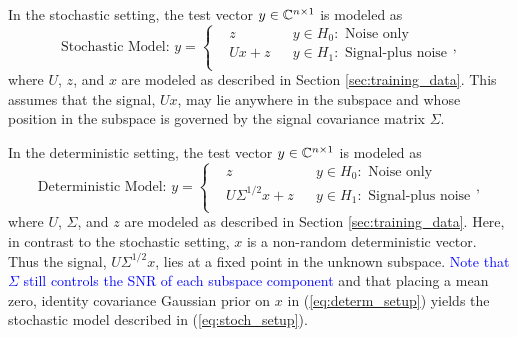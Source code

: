In the stochastic setting, the test vector $y\in\mathbb{C}^{n\times 1}$ is modeled as
\small\begin{equation}\label{eq:stoch_setup}
\text{Stochastic Model: }y=\left\{
\begin{aligned}
&z
&& y\in H_0:\text{ Noise only}\\
&Ux+z
&& y\in H_1:\text{ Signal-plus noise}\\
\end{aligned}\right. ,
\end{equation}\normalsize
where $U$, $z$, and $x$ are modeled as described in Section \ref{sec:training_data}. This assumes that the signal, $Ux$, may lie anywhere in the subspace and whose position in the subspace is governed by the signal covariance matrix $\Sigma$.

In the deterministic setting, the test vector $y\in\mathbb{C}^{n\times 1}$ is modeled as
\small\begin{equation}\label{eq:determ_setup}
\text{Deterministic Model: }y=\left\{
\begin{aligned}
&z
&& y\in H_0:\text{ Noise only}\\
&U\Sigma^{1/2} x+z
&& y\in H_1:\text{ Signal-plus noise}\\
\end{aligned}\right. ,
\end{equation}\normalsize
where $U$, $\Sigma$, and $z$ are modeled as described in Section \ref{sec:training_data}. Here, in contrast to the stochastic setting, $x$ is a non-random deterministic vector. Thus the signal, $U\Sigma^{1/2}x$, lies at a fixed point in the unknown subspace. \textcolor{blue}{Note that $\Sigma$ still controls the SNR of each subspace component} and that placing a mean zero, identity covariance Gaussian prior on $x$ in (\ref{eq:determ_setup}) yields the stochastic model described in (\ref{eq:stoch_setup}).

